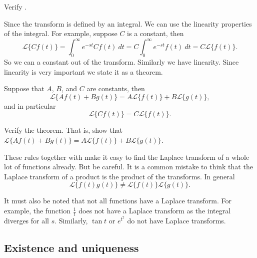 \documentclass[12pt]{book}
\begin{document}
\begin{exercise}
Verify .
\end{exercise}

Since the transform is defined by an integral.  We can use the linearity
properties of the integral.  For example, suppose $C$ is a constant, then
\begin{equation*}
\mathcal{L} \{ C f(t) \} =
\int_0^\infty e^{-st} C f(t) ~dt =
C \int_0^\infty e^{-st} f(t) ~dt =
C \mathcal{L} \{ f(t) \} .
\end{equation*}
So we can  a constant out of the transform.  Similarly  we have
linearity.
Since linearity is very important we state it as a theorem.

\begin{theorem}
Suppose that $A$, $B$, and $C$ are constants, then
\begin{equation*}
\boxed{~~
\mathcal{L} \{ A f(t) + B g(t) \} =
A \mathcal{L} \{ f(t) \} +
B \mathcal{L} \{ g(t) \} ,
~~}
\end{equation*}
and in particular
\begin{equation*}
\mathcal{L} \{ C f(t) \} =
C \mathcal{L} \{ f(t) \} .
\end{equation*}
\end{theorem}

\begin{exercise}
Verify the theorem.  That is, show that
$\mathcal{L} \{ A f(t) + B g(t) \} =
A \mathcal{L} \{ f(t) \} +
B \mathcal{L} \{ g(t) \}$.
\end{exercise}

These rules together with  make it easy to find
the Laplace transform of a whole lot of functions already.
But be careful.
It is a common mistake to think that the Laplace transform of a product
is the product of the transforms.  In general 
\begin{equation*}
\mathcal{L} \{ f(t) g(t) \} \not=
\mathcal{L} \{ f(t) \}
\mathcal{L} \{ g(t) \} .
\end{equation*}

It must also be noted that not all functions have a Laplace transform.  For
example, the function $\frac{1}{t}$ does not have a Laplace transform as the
integral diverges for all $s$.  Similarly,
$\tan t$ or $e^{t^2}$ do not have Laplace transforms.

\subsection{Existence and uniqueness}
\end{document}
